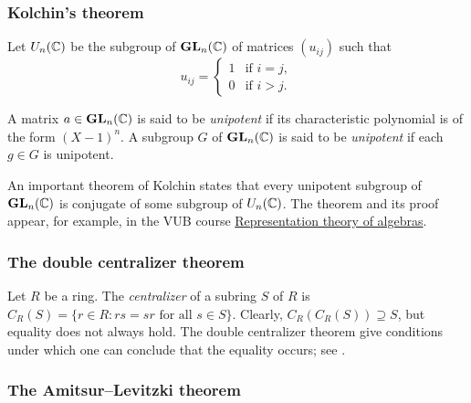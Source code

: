 %

\subsubsection*{Kolchin's theorem}

Let $U_n(\mathbb{C})$ be the subgroup of $\mathbf{GL}_n(\mathbb{C})$ 
of matrices $(u_{ij})$ such that 
\[
u_{ij}=\begin{cases}
1&\text{if $i=j$},\\
0&\text{if $i>j$}.\end{cases}
\]

A matrix $a\in\mathbf{GL}_n(\mathbb{C})$ is said to be \emph{unipotent} 
if its characteristic polynomial is of the form $(X-1)^n$. 
A subgroup $G$ of $\mathbf{GL}_n(\mathbb{C})$ is said to be \emph{unipotent} if
each $g\in G$ is unipotent. 

An important theorem of Kolchin states that 
every unipotent subgroup of $\mathbf{GL}_n(\mathbb{C})$ is conjugate
of some subgroup of $U_n(\mathbb{C})$. The theorem and its proof 
appear, for example, 
in the 
VUB course \href{https://github.com/vendramin/representation}{Representation theory of algebras}.

\subsubsection*{The double centralizer theorem}

Let $R$ be a ring. 
The \emph{centralizer} of a subring $S$ of $R$ 
is 
$C_R(S)=\{r\in R: rs=sr\text{ for all $s\in S$}\}$. 
Clearly, $C_R(C_R(S))\supseteq S$, but equality does not always hold. 
The double centralizer theorem give conditions under which one can conclude that the equality occurs; see \cite[Chapter 4]{MR3308118}. 

\subsubsection*{The Amitsur--Levitzki theorem}

